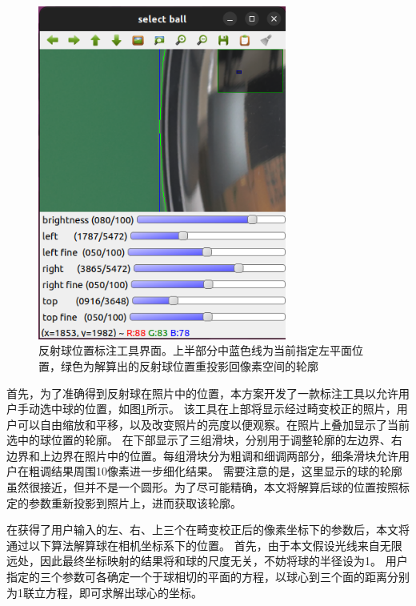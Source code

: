 \begin{figure}
\centering
\includegraphics[height=11cm]{figures/sphere_locator}
\caption[反射球位置标注工具界面]{反射球位置标注工具界面。上半部分中蓝色线为当前指定左平面位置，绿色为解算出的反射球位置重投影回像素空间的轮廓}
\label{fig:sphere_locator}
\end{figure}
首先，为了准确得到反射球在照片中的位置，本方案开发了一款标注工具以允许用户手动选中球的位置，如图\ref{fig:sphere_locator}所示。
该工具在上部将显示经过畸变校正的照片，用户可以自由缩放和平移，以及改变照片的亮度以便观察。在照片上叠加显示了当前选中的球位置的轮廓。
在下部显示了三组滑块，分别用于调整轮廓的左边界、右边界和上边界在照片中的位置。每组滑块分为粗调和细调两部分，细条滑块允许用户在粗调结果周围10像素进一步细化结果。
需要注意的是，这里显示的球的轮廓虽然很接近，但并不是一个圆形。为了尽可能精确，本文将解算后球的位置按照标定的参数重新投影到照片上，进而获取该轮廓。

在获得了用户输入的左、右、上三个在畸变校正后的像素坐标下的参数后，本文将通过以下算法解算球在相机坐标系下的位置。
首先，由于本文假设光线来自无限远处，因此最终坐标映射的结果将和球的尺度无关，不妨将球的半径设为1。
用户指定的三个参数可各确定一个于球相切的平面的方程，以球心到三个面的距离分别为1联立方程，即可求解出球心的坐标。

